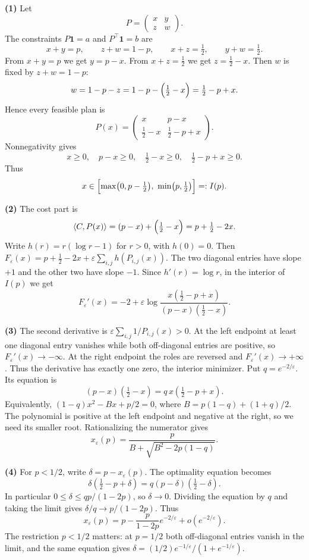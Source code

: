\documentclass[11pt,a4paper]{article}
\theoremstyle{exostyle}
\newcommand{\ip}[2]{\langle #1,#2\rangle}
\begin{document}
\begin{solution}
\textbf{(1)} Let
\[
P = \begin{pmatrix} x & y \\ z & w \end{pmatrix}.
\]
The constraints $P\mathbf 1 = a$ and $P^\top \mathbf 1 = b$ are
\[
x + y = p,\qquad z + w = 1 - p,\qquad x + z = \tfrac12,\qquad y + w = \tfrac12.
\]
From $x+y=p$ we get $y=p-x$. From $x+z=\tfrac12$ we get $z=\tfrac12 - x$. Then $w$ is fixed by $z+w=1-p$:
\[
w = 1 - p - z = 1 - p - \Bigl(\tfrac12 - x\Bigr) = \tfrac12 - p + x.
\]
Hence every feasible plan is
\[
P(x) =
\begin{pmatrix}
x & p - x\\[2pt]
\tfrac12 - x & \tfrac12 - p + x
\end{pmatrix}.
\]
Nonnegativity gives
\[
x \ge 0,\quad p - x \ge 0,\quad \tfrac12 - x \ge 0,\quad \tfrac12 - p + x \ge 0.
\]
Thus
\[
x \in \Bigl[\max\bigl(0,p-\tfrac12\bigr),\ \min\bigl(p,\tfrac12\bigr)\Bigr] =: I(p).
\]

\medskip
\textbf{(2)} The cost part is
\[
\ip{C}{P(x)} = (p - x) + \Bigl(\tfrac12 - x\Bigr) = p + \tfrac12 - 2x.
\]
Write $h(r)=r(\log r-1)$ for $r>0$, with $h(0)=0$. Then
$F_\varepsilon(x)=p+\tfrac12-2x+\varepsilon\sum_{i,j}h(P_{i,j}(x))$.
The two diagonal entries have slope $+1$ and the other two have slope
$-1$. Since $h'(r)=\log r$, in the interior of $I(p)$ we get
\[
 F_\varepsilon'(x)=-2+\varepsilon\log
 \frac{x(\tfrac12-p+x)}{(p-x)(\tfrac12-x)} .
\]

\textbf{(3)} The second derivative is
$\varepsilon\sum_{i,j}1/P_{i,j}(x)>0$. At the left endpoint at least
one diagonal entry vanishes while both off-diagonal entries are
positive, so $F_\varepsilon'(x)\to-\infty$. At the right endpoint
the roles are reversed and $F_\varepsilon'(x)\to+\infty$.
Thus the derivative has exactly one zero, the interior minimizer.
Put $q=e^{-2/\varepsilon}$. Its equation is
\[
 (p-x)(\tfrac12-x)=q\,x(\tfrac12-p+x).
\]
Equivalently, $(1-q)x^2-Bx+p/2=0$, where
$B=p(1-q)+(1+q)/2$. The polynomial is positive at the left
endpoint and negative at the right, so we need its smaller root.
Rationalizing the numerator gives
\[
 x_\varepsilon(p)=\frac{p}{B+\sqrt{B^2-2p(1-q)}} .
\]

\textbf{(4)} For $p<1/2$, write $\delta=p-x_\varepsilon(p)$. The
optimality equation becomes
\[
 \delta(\tfrac12-p+\delta)=q(p-\delta)(\tfrac12-\delta).
\]
In particular $0\le\delta\le qp/(1-2p)$, so $\delta\to0$. Dividing
the equation by $q$ and taking the limit gives
$\delta/q\to p/(1-2p)$. Thus
\[
 x_\varepsilon(p)=p-\frac{p}{1-2p}e^{-2/\varepsilon}
                   +o(e^{-2/\varepsilon}).
\]
The restriction $p<1/2$ matters: at $p=1/2$ both off-diagonal entries
vanish in the limit, and the same equation gives
$\delta=(1/2)e^{-1/\varepsilon}/(1+e^{-1/\varepsilon})$.
\end{solution}
\end{document}
